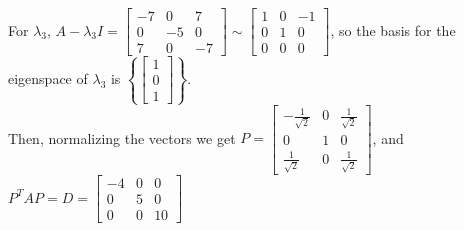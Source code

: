 \documentclass[10pt,english]{article}
\begin{document}
\begin{enumerate}
\begin{enumerate}
    For $\lambda_3$, $A-\lambda_3I=\begin{bmatrix}-7&0&7\\0&-5&0\\7&0&-7\end{bmatrix}\sim\begin{bmatrix}1&0&-1\\0&1&0\\0&0&0\end{bmatrix}$, so the basis for the eigenspace of $\lambda_3$ is $\left\{\begin{bmatrix}1\\0\\1\end{bmatrix}\right\}$. \\ 
    Then, normalizing the vectors we get $P=\begin{bmatrix}-\frac{1}{\sqrt{2}}&0&\frac{1}{\sqrt{2}}\\0&1&0\\\frac{1}{\sqrt{2}}&0&\frac{1}{\sqrt{2}}\end{bmatrix}$, and $P^TAP=D=\begin{bmatrix}-4&0&0\\0&5&0\\0&0&10\end{bmatrix}$
    
\end{enumerate}


\end{enumerate}
\end{document}
